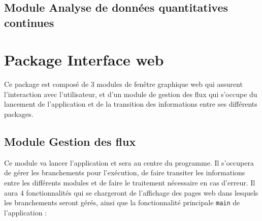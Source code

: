 		\subsection{Module Analyse de données quantitatives continues}
		
	\section{Package Interface web}
		Ce package est composé de 3 modules de fenêtre graphique web qui assurent l'interaction avec l'utilisateur, et d'un module de gestion des flux qui s'occupe du lancement de l'application et de la transition des informations entre ses différents packages.
		
		\subsection{Module Gestion des flux}
		Ce module va lancer l'application et sera au centre du programme. Il s'occupera de gérer les branchements pour l'exécution, de faire transiter les informations entre les différents modules et de faire le traitement nécessaire en cas d'erreur. Il aura 4 fonctionnalités qui se chargeront de l'affichage des pages web dans lesquels les branchements seront gérés, ainsi que la fonctionnalité principale \lstinline!main! de l'application :
		
